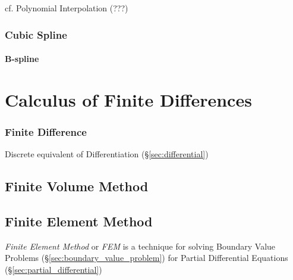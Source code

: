 cf. Polynomial Interpolation (???) %



\subsubsection{Cubic Spline}\label{sec:cubic_spline}

\paragraph{B-spline}\label{sec:b_spline}\hfill



\section{Calculus of Finite Differences}\label{sec:finite_differences_calculus}


\subsubsection{Finite Difference}\label{sec:finite_difference}

Discrete equivalent of Differentiation (\S\ref{sec:differential})



\subsection{Finite Volume Method}\label{sec:finite_volume_method}

\subsection{Finite Element Method}\label{sec:finite_element_method}

\emph{Finite Element Method} or \emph{FEM} is a technique for solving Boundary
Value Problems (\S\ref{sec:boundary_value_problem}) for Partial Differential
Equations (\S\ref{sec:partial_differential})

